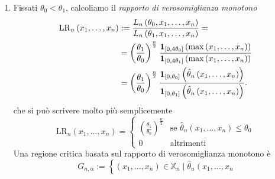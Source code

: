 \begin{soluzione}
\begin{enumerate}
  \item Fissati \(\theta_0 < \theta_1\), calcoliamo il {\em rapporto
      di verosomiglianza monotono}
    \begin{align*}
      \mathrm{LR}_n \left( x_1, \dots{}, x_n \right) &:= \frac{L_n
                                                       \left(\theta_0, x_1,
                                                       \dots{}, x_n
                                                       \right)}{L_n
                                                       \left(\theta_1, x_1,
                                                       \dots{}, x_n
                                                       \right)} = \\
                                                     &= \left( \frac{\theta_1}{\theta_0} \right)^{\frac{n}{2}} \frac{\mathbf 1_{[0, 4\theta_0]}\left(\max \left( x_1, \dots{}, x_n \right)\right)}{\mathbf 1_{[0, 4\theta_1]}\left(\max \left( x_1, \dots{}, x_n \right)\right)} \\
                                                     &= \left(
                                                       \frac{\theta_1}{\theta_0}
                                                       \right)^{\frac{n}{2}}
                                                       \frac{\mathbf 1_{[0,
                                                       \theta_0]}\left(\hat \theta_n
                                                       \left( x_1,
                                                       \dots{}, x_n
                                                       \right)\right)}{\mathbf 1_{[0,
                                                       \theta_1]}\left(\hat \theta_n
                                                       \left( x_1,
                                                       \dots{}, x_n
                                                       \right)\right)} .
    \end{align*}
    che si può scrivere molto più semplicemente
    \[
      \mathrm{LR}_n \left( x_1, \dots{}, x_n \right) =
      \begin{cases}
        \left( \frac{\theta_1}{\theta_0} \right)^{\frac{n}{2}} & \text{se } \hat \theta_n \left( x_1, \dots{}, x_n
                                                                 \right) \le \theta_0 \\
        0 & \text{altrimenti}
      \end{cases}
    \]
    Una regione critica basata sul rapporto di verosomiglianza
    monotono è
    \[
      G_{n, \alpha} := \left\{ \left( x_1, \dots{}, x_n \right) \in
        \mathbb{X}_n \mid \hat \theta_n \left( x_1, \dots{}, x_n
\]
\end{enumerate}
\end{soluzione}
